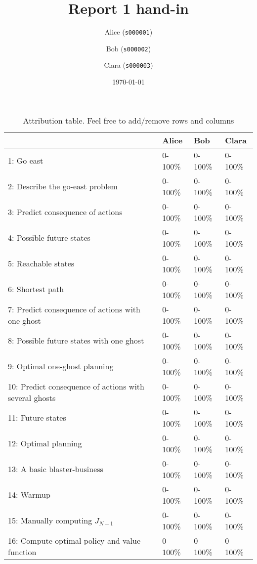 \documentclass[12pt,twoside]{article}
\title{ Report 1 hand-in }
\date{ \today }
\author{Alice (\texttt{s000001})\and  Bob (\texttt{s000002})\and Clara (\texttt{s000003}) }
\begin{document}
\maketitle

\begin{table}[ht!]
\caption{Attribution table. Feel free to add/remove rows and columns}
\begin{tabular}{llll}
\toprule
                                                        & Alice   & Bob    & Clara   \\
\midrule
 1: Go east                                             & 0-100\%  & 0-100\% & 0-100\%  \\
 2: Describe the go-east problem                        & 0-100\%  & 0-100\% & 0-100\%  \\
 3: Predict consequence of actions                      & 0-100\%  & 0-100\% & 0-100\%  \\
 4: Possible future states                              & 0-100\%  & 0-100\% & 0-100\%  \\
 5: Reachable states                                    & 0-100\%  & 0-100\% & 0-100\%  \\
 6: Shortest path                                       & 0-100\%  & 0-100\% & 0-100\%  \\
 7: Predict consequence of actions with one ghost       & 0-100\%  & 0-100\% & 0-100\%  \\
 8: Possible future states with one ghost               & 0-100\%  & 0-100\% & 0-100\%  \\
 9: Optimal one-ghost planning                          & 0-100\%  & 0-100\% & 0-100\%  \\
 10: Predict consequence of actions with several ghosts & 0-100\%  & 0-100\% & 0-100\%  \\
 11: Future states                                      & 0-100\%  & 0-100\% & 0-100\%  \\
 12: Optimal planning                                   & 0-100\%  & 0-100\% & 0-100\%  \\
 13: A basic blaster-business                           & 0-100\%  & 0-100\% & 0-100\%  \\
 14: Warmup                                             & 0-100\%  & 0-100\% & 0-100\%  \\
 15: Manually computing $J_{N-1}$                       & 0-100\%  & 0-100\% & 0-100\%  \\
 16: Compute optimal policy and value function          & 0-100\%  & 0-100\% & 0-100\%  \\

\end{tabular}
\end{table}
\end{document}
